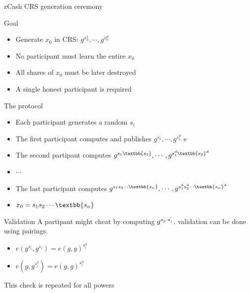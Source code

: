 \documentclass[handout]{beamer}
\begin{document}
\begin{frame}[allowframebreaks]{zCash CRS generation ceremony}
    \begin{block}{Goal}
        \begin{itemize}
            \item Generate $x_0$ in CRS: $g^{x_0^1}, \cdots, g^{x_0^d}$
            \item No participant must learn the entire $x_0$
            \item All shares of $x_0$ must be later destroyed
            \item A single honest participant is required
        \end{itemize}
    \end{block} \pause
    \framebreak
    \begin{block}{The protocol}
        \begin{itemize}
            \item Each participant generates a random $s_i$  
            \item The first participant computes and publishes $g^{s_1}, \cdots, g^{s_1^d}$    e
            \item The second partipant computes $g^{s_1 \textbb{s_2}}, \cdots, g^{s_1^d \textbb{s_2}^d}$  
            \item $\cdots$  
            \item The last participant computes $g^{s_1 s_2 \cdots \textbb{s_n}}, \cdots, g^{s_1^d s_2^d \cdots \textbb{s_n}^d}$  
            \item $x_0 = s_1 s_2 \cdots \textbb{s_n}$  
        \end{itemize} 
    \end{block}
    \framebreak
    \begin{block}{Validation}
         A partipant might cheat by computing $g^{s_p \cdot s_i^`}$. validation can be done using pairings.
         \begin{itemize}
            \item $e(g^{s_i},g^{s_i})=e(g,g)^{s_i^2}$  
            \item $e(g,g^{s_i^2})=e(g,g)^{s_i^2}$  
         \end{itemize}
         This check is repeated for all powers 
    \end{block}
\end{frame}
\end{document}
